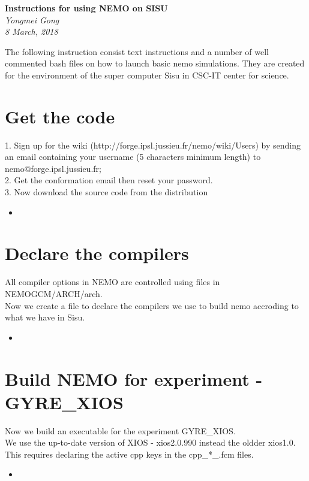 \documentclass[11pt]{article}
\newcommand{\insertcode}[2]{\begin{itemize}\item[]\end{itemize}} %
\begin{document}
\begin{titlepage}
   \begin{center}
      \Large\textbf{Instructions for using NEMO on SISU}\\[4\baselineskip]
      \large\textit{Yongmei Gong}\\
      \large\textit{8 March, 2018}
   \end{center}
\end{titlepage}

The following instruction consist text instructions and a number of well commented bash files on how to launch basic nemo simulations. They are created for the environment of the super computer Sisu in CSC-IT center for science.\\
\tableofcontents
\newpage
\section{Get the code}
1. Sign up for the wiki (http://forge.ipsl.jussieu.fr/nemo/wiki/Users) by sending an email containing your username (5 characters minimum length) to nemo@forge.ipsl.jussieu.fr;\\
2. Get the conformation email then reset your password.\\
3. Now download the source code from the distribution
\insertcode{"./get_nemo_code.bash"}{} %
\section{Declare the compilers}
All compiler options in NEMO are controlled using files in NEMOGCM/ARCH/arch.\\
Now we create a file to declare the compilers we use to build nemo accroding to what we have in Sisu.
\insertcode{"./creat_compiler_links.bash"}{} %
\section{Build NEMO for experiment - GYRE\_XIOS}
Now we build an executable for the experiment GYRE\_XIOS.\\
We use the up-to-date version of XIOS - xios\/2.0.990 instead the oldder xios\/1.0. This requires declaring the active cpp keys in the cpp\_*\_.fcm files.
\insertcode{"./launch_GYRE_XIOS.bash"}{} %
\end{document}
